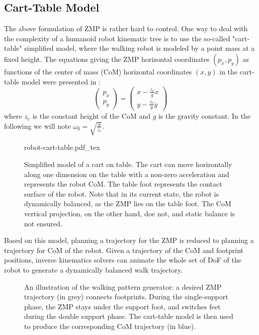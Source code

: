\subsection{Cart-Table Model}
\label{subsec:chap1-cart-table}

The above formulation of ZMP is rather hard to control.  One way to
deal with the complexity of a humanoid robot kinematic tree is to use
the so-called "cart-table" simplified model, where the walking robot
is modeled by a point mass at a fixed height.  The equations giving
the ZMP horizontal coordinates $(p_x,p_y)$ as functions of the center
of mass (CoM) horizontal coordinates $(x,y)$ in the cart-table model
were presented in \cite{kaji03}:
\begin{equation}
\label{eq:walk-zmp}
\left(
\begin{array}{c}
p_x\\ p_y
\end{array}
\right) = \displaystyle \left(
\begin{array}{c}
x - \frac{z_c}{g} \ddot{x}\\ y - \frac{z_c}{g} \ddot{y}
\end{array}
\right)
\end{equation}
where $z_c$ is the constant height of the CoM and $g$ is the gravity
constant.  In the following we will note $\omega_0
=\sqrt{\frac{g}{z_c}}$.

\begin{figure}
  \centering
      {\def\svgwidth{0.5\linewidth}
        
                   {robot-cart-table.pdf_tex}}
      \caption{Simplified model of a cart on table. The cart can move
        horizontally along one dimension on the table with a non-zero
        acceleration and represents the robot CoM. The table foot
        represents the contact surface of the robot. Note that in its
        current state, the robot is dynamically balanced, as the ZMP
        lies on the table foot. The CoM vertical projection, on the
        other hand, doe not, and static balance is not ensured.}
      \label{fig:chap1-robot-cart-table}
\end{figure}

Based on this model, planning a trajectory for the ZMP is reduced to
planning a trajectory for CoM of the robot. Given a trajectory of the
CoM and footprint positions, inverse kinematics solvers can animate
the whole set of DoF of the robot to generate a dynamically balanced
walk trajectory.

\begin{figure}
  \centering
  
  \caption{An illustration of the walking pattern generator: a desired
    ZMP trajectory (in grey) connects footprints. During the
    single-support phase, the ZMP stays under the support foot, and
    switches feet during the double support phase. The cart-table
    model is then used to produce the corresponding CoM trajectory (in
    blue).}
  \label{fig:chap1-zmp}
\end{figure}

